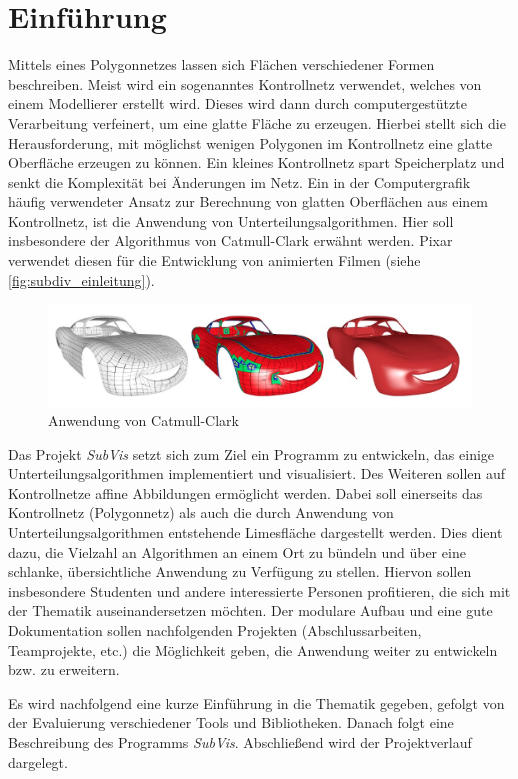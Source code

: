 \chapter{Einführung}

Mittels eines Polygonnetzes lassen sich Flächen verschiedener Formen beschreiben. 
Meist wird ein sogenanntes Kontrollnetz verwendet, welches von einem Modellierer erstellt wird.
Dieses wird dann durch computergestützte Verarbeitung verfeinert, um eine glatte Fläche zu erzeugen.
Hierbei stellt sich die Herausforderung, mit möglichst wenigen Polygonen im Kontrollnetz eine glatte Oberfläche erzeugen zu können.
Ein kleines Kontrollnetz spart Speicherplatz und senkt die Komplexität bei Änderungen im Netz.
Ein in der Computergrafik häufig verwendeter Ansatz zur Berechnung von glatten Oberflächen aus einem Kontrollnetz, ist die Anwendung von Unterteilungsalgorithmen.
Hier soll insbesondere der Algorithmus von Catmull-Clark erwähnt werden.
Pixar verwendet diesen für die Entwicklung von animierten Filmen (siehe \autoref{fig:subdiv_einleitung}).

\begin{figure}
  \centering
  \includegraphics[width=\textwidth]{content/media/sd_einleitung.jpg}
  \caption{Anwendung von Catmull-Clark \cite{niessner2012feature}}
  \label{fig:subdiv_einleitung}
\end{figure}


Das Projekt \emph{SubVis} setzt sich zum Ziel ein Programm zu entwickeln, das einige Unterteilungsalgorithmen implementiert und visualisiert. 
Des Weiteren sollen auf Kontrollnetze affine Abbildungen ermöglicht werden.
Dabei soll einerseits das Kontrollnetz (Polygonnetz) als auch die durch Anwendung von Unterteilungsalgorithmen entstehende Limesfläche dargestellt werden.
Dies dient dazu, die Vielzahl an Algorithmen an einem Ort zu bündeln und über eine schlanke, übersichtliche Anwendung zu Verfügung zu stellen.
Hiervon sollen insbesondere Studenten und andere interessierte Personen profitieren, die sich mit der Thematik auseinandersetzen möchten.
Der modulare Aufbau und eine gute Dokumentation sollen nachfolgenden Projekten (Abschlussarbeiten, Teamprojekte, etc.) die Möglichkeit geben, die Anwendung weiter zu entwickeln bzw. zu erweitern.

Es wird nachfolgend eine kurze Einführung in die Thematik gegeben, gefolgt von der Evaluierung verschiedener Tools und Bibliotheken. 
Danach folgt eine Beschreibung des Programms \emph{SubVis}.
Abschließend wird der Projektverlauf dargelegt.